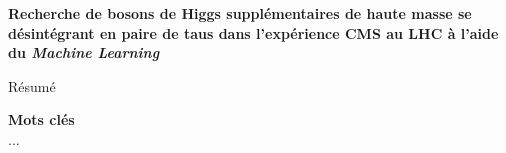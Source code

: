 \begin{center}
\LARGE
\bf
\sffamily
Recherche de bosons de Higgs supplémentaires de haute masse se désintégrant en paire de taus dans l'expérience CMS au LHC à l'aide du \emph{Machine Learning}
\end{center}
\bigskip

Résumé

\vfill

\textbf{\Large Mots clés}\\
...

\vfill